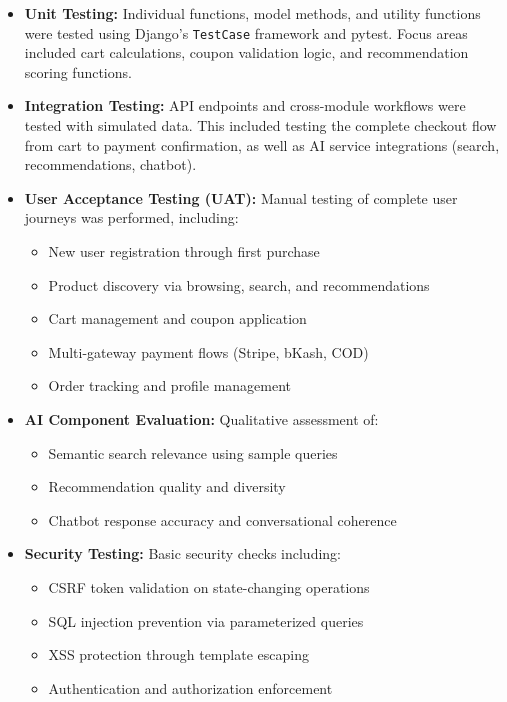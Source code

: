 \begin{itemize}
  \item \textbf{Unit Testing:} Individual functions, model methods, and utility functions were tested using Django's \texttt{TestCase} framework and pytest. Focus areas included cart calculations, coupon validation logic, and recommendation scoring functions.
  
  \item \textbf{Integration Testing:} API endpoints and cross-module workflows were tested with simulated data. This included testing the complete checkout flow from cart to payment confirmation, as well as AI service integrations (search, recommendations, chatbot).
  
  \item \textbf{User Acceptance Testing (UAT):} Manual testing of complete user journeys was performed, including:
  \begin{itemize}
    \item New user registration through first purchase
    \item Product discovery via browsing, search, and recommendations
    \item Cart management and coupon application
    \item Multi-gateway payment flows (Stripe, bKash, COD)
    \item Order tracking and profile management
  \end{itemize}
  
  \item \textbf{AI Component Evaluation:} Qualitative assessment of:
  \begin{itemize}
    \item Semantic search relevance using sample queries
    \item Recommendation quality and diversity
    \item Chatbot response accuracy and conversational coherence
  \end{itemize}
  
  \item \textbf{Security Testing:} Basic security checks including:
  \begin{itemize}
    \item CSRF token validation on state-changing operations
    \item SQL injection prevention via parameterized queries
    \item XSS protection through template escaping
    \item Authentication and authorization enforcement
  \end{itemize}
\end{itemize}

